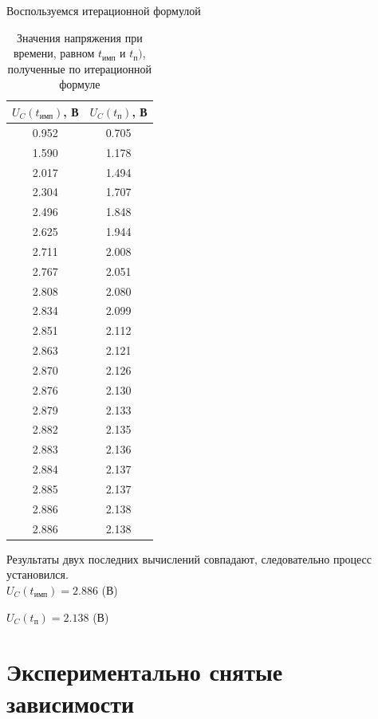 	Воспользуемся итерационной формулой
\begin{table}[H]

	\begin{center}
	\caption{Значения напряжения при времени, равном $t_\text{имп}$ и $t_\text{п})$, полученные по итерационной формуле}
	\begin{tabular}{|c|c|}
		\hline 
		$U_C(t_\text{имп})$, В & $U_C(t_\text{п})$, В \\ 
		\hline 
		0.952 & 0.705 \\ 
		\hline 
		1.590 & 1.178 \\ 
		\hline 
		2.017 & 1.494 \\ 
		\hline 
		2.304 & 1.707 \\ 
		\hline 
		2.496 & 1.848 \\ 
		\hline 
		2.625 & 1.944 \\ 
		\hline 
		2.711 & 2.008 \\ 
		\hline 
		2.767 & 2.051 \\ 
		\hline 
		2.808 & 2.080 \\ 
		\hline 
		2.834 & 2.099 \\ 
		\hline 
		2.851 & 2.112 \\ 
		\hline 
		2.863 & 2.121 \\ 
		\hline 
		2.870 & 2.126 \\ 
		\hline 
		2.876 & 2.130 \\ 
		\hline 
		2.879 & 2.133 \\ 
		\hline 
		2.882 & 2.135 \\ 
		\hline 
		2.883 & 2.136 \\ 
		\hline 
		2.884 & 2.137 \\ 
		\hline 
		2.885 & 2.137 \\ 
		\hline 
		2.886 & 2.138 \\ 
		\hline 
		2.886 & 2.138 \\ 
		\hline 
		\end{tabular}  	
		
	\end{center}
\end{table}
	Результаты двух последних вычислений совпадают, следовательно процесс установился.\\
	
	$U_C(t_\text{имп}) = 2.886$ (В)
	
	$U_C(t_\text{п}) = 2.138$ (В)

\section{Экспериментально снятые зависимости}

